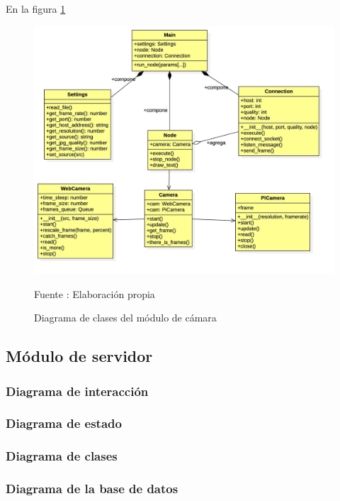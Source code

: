 En la figura \ref{fig:camera_clases}
\begin{figure}[H]
    \begin{center}
        \includegraphics[width=15cm]{img/capitulo_4/camera_clases.jpg}
        \caption{Diagrama de clases del módulo de cámara}
        Fuente : Elaboración propia
        \label{fig:camera_clases}
    \end{center}
\end{figure}

\subsection{Módulo de servidor}

\subsubsection{Diagrama de interacción}

\subsubsection{Diagrama de estado}

\subsubsection{Diagrama de clases}

\subsubsection{Diagrama de la base de datos}

